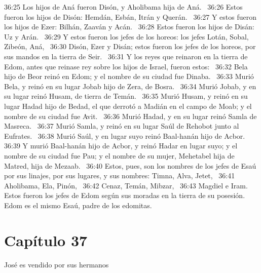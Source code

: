 36:25 Los hijos de Aná fueron Disón, y Aholibama hija de Aná.  
36:26 Estos fueron los hijos de Disón: Hemdán, Esbán, Itrán y Querán.  
36:27 Y estos fueron los hijos de Ezer: Bilhán, Zaaván y Acán.  
36:28 Estos fueron los hijos de Disán: Uz y Arán.  
36:29 Y estos fueron los jefes de los horeos: los jefes Lotán, Sobal, Zibeón, Aná,  
36:30 Disón, Ezer y Disán; estos fueron los jefes de los horeos, por sus mandos en la tierra de Seir.  
36:31 Y los reyes que reinaron en la tierra de Edom, antes que reinase rey sobre los hijos de Israel, fueron estos:  
36:32 Bela hijo de Beor reinó en Edom; y el nombre de su ciudad fue Dinaba.  
36:33 Murió Bela, y reinó en su lugar Jobab hijo de Zera, de Bosra.  
36:34 Murió Jobab, y en su lugar reinó Husam, de tierra de Temán.  
36:35 Murió Husam, y reinó en su lugar Hadad hijo de Bedad, el que derrotó a Madián en el campo de Moab; y el nombre de su ciudad fue Avit.  
36:36 Murió Hadad, y en su lugar reinó Samla de Masreca.  
36:37 Murió Samla, y reinó en su lugar Saúl de Rehobot junto al Eufrates.  
36:38 Murió Saúl, y en lugar suyo reinó Baal-hanán hijo de Acbor.  
36:39 Y murió Baal-hanán hijo de Acbor, y reinó Hadar en lugar suyo; y el nombre de su ciudad fue Pau; y el nombre de su mujer, Mehetabel hija de Matred, hija de Mezaab.  
36:40 Estos, pues, son los nombres de los jefes de Esaú por sus linajes, por sus lugares, y sus nombres: Timna, Alva, Jetet,  
36:41 Aholibama, Ela, Pinón,  
36:42 Cenaz, Temán, Mibzar,  
36:43 Magdiel e Iram. Estos fueron los jefes de Edom según sus moradas en la tierra de su posesión. Edom es el mismo Esaú, padre de los edomitas.  
\section*{Capítulo 37}
José es vendido por sus hermanos  

